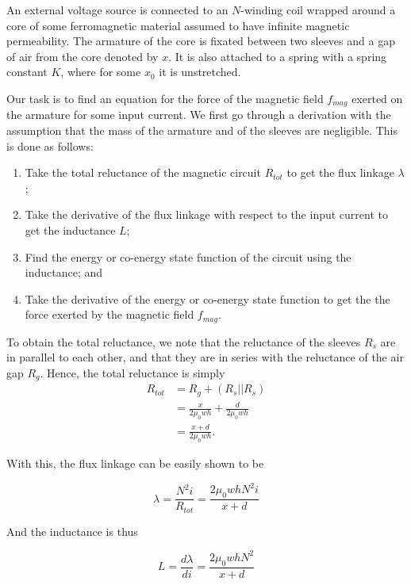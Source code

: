 \documentclass[conference]{IEEEtran}
\begin{document}
An external voltage source is connected to an $N$-winding coil wrapped around a core of some ferromagnetic material assumed to have infinite magnetic permeability. The armature of the core is fixated between two sleeves and a gap of air from the core denoted by $x$. It is also attached to a spring with a spring constant $K$, where for some $x_0$ it is unstretched.

Our task is to find an equation for the force of the magnetic field $f_{mag}$ exerted on the armature for some input current. We first go through a derivation with the assumption that the mass of the armature and of the sleeves are negligible. This is done as follows:

\begin{enumerate}
    \item Take the total reluctance of the magnetic circuit $R_{tot}$ to get the flux linkage $\lambda$;
    \item Take the derivative of the flux linkage with respect to the input current to get the inductance $L$;
    \item Find the energy or co-energy state function of the circuit using the inductance; and
    \item Take the derivative of the energy or co-energy state function to get the the force exerted by the magnetic field $f_{mag}$.
\end{enumerate}

To obtain the total reluctance, we note that the reluctance of the sleeves $R_{s}$ are in parallel to each other, and that they are in series with the reluctance of the air gap $R_{g}$. Hence, the total reluctance is simply
\begin{align*}
    R_{tot} &= R_{g} + (R_{s}|| R_{s}) \\
    &= \frac{x}{2\mu_{0} wh} + \frac{d}{2\mu_{0} wh} \\
    &= \frac{x+d}{2\mu_{0} wh}.
\end{align*}

With this, the flux linkage can be easily shown to be

\begin{equation*}
    \lambda = \frac{N^{2}i}{R_{tot}} = \frac{2\mu_{0} wh N^{2}i}{x+d}
\end{equation*}

And the inductance is thus

\begin{equation*}
    L = \frac{d\lambda}{di} = \frac{2\mu_{0} wh N^{2}}{x+d}
\end{equation*}
\end{document}
